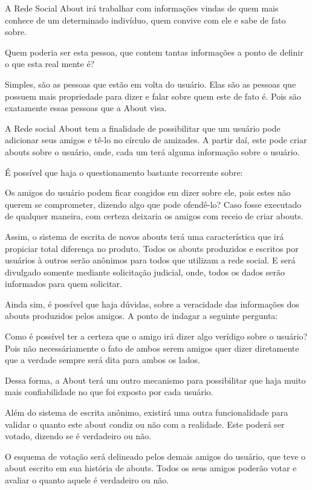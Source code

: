 A Rede Social About irá trabalhar com informações vindas de quem mais conhece de um determinado
indivíduo, quem convive com ele e sabe de fato sobre. 

Quem poderia ser esta pessoa, que contem tantas informações a ponto de definir o que esta real
mente é?

Simples, são as pessoas que estão em volta do usuário. Elas são as pessoas que possuem mais propriedade para dizer
e falar sobre quem este de fato é. Pois são exatamente essas pessoas que a About visa.

A Rede social About tem a finalidade de possibilitar que um usuário pode adicionar seus amigos  e tê-lo no círculo de amizades.
A partir daí, este pode criar abouts sobre o usuário, onde, cada um terá alguma informação sobre o usuário.

É possível que haja o questionamento bastante recorrente sobre:

Os amigos do usuário podem ficar coagidos em dizer sobre ele, pois estes não querem se comprometer,
dizendo algo que pode ofendê-lo? Caso fosse executado de qualquer maneira, com certeza deixaria os amigos
com receio de criar abouts.

Assim, o sistema de escrita de novos abouts terá uma característica que irá propiciar total diferença
no produto. Todos os abouts produzidos e escritos por usuários à outros serão anônimos para todos
que utilizam a rede social. E será divulgado somente mediante solicitação judicial, onde, todos
os dados serão informados para quem solicitar.


Ainda sim, é possível que haja dúvidas, sobre a veracidade das informações dos abouts produzidos pelos
amigos. A ponto de indagar a seguinte pergunta:

Como é possível ter a certeza que o amigo irá dizer algo verídigo sobre o usuário? Pois não necessáriamente o fato
de ambos serem amigos quer dizer diretamente que a verdade sempre será dita para ambos os lados.

Dessa forma, a About terá um outro mecanismo para possibilitar que haja muito mais confiabilidade no que foi exposto
por cada usuário.

Além do sistema de escrita anônimo, existirá uma outra funcionalidade para validar o quanto este about condiz ou não
com a realidade. Este poderá ser votado, dizendo se é verdadeiro ou não. 

O esquema de votação será delineado pelos demais amigos do usuário, que teve o about escrito em sua história de abouts.
Todos os seus amigos poderão votar e avaliar o quanto aquele é verdadeiro ou não.

